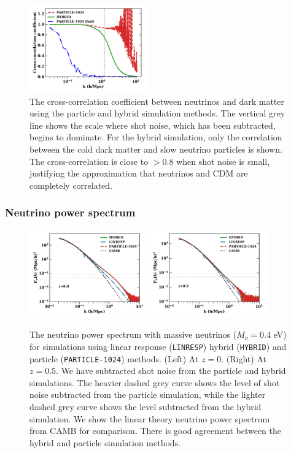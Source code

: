 \documentclass[useAMS, usenatbib]{mnras}
\begin{document}
\begin{figure}
\includegraphics[width=0.45\textwidth]{nuplots/corr_coeff-1.pdf}
  \caption{The cross-correlation coefficient between neutrinos and dark matter using the particle and hybrid simulation methods.
  The vertical grey line shows the scale where shot noise, which has been subtracted, begins to dominate.
  For the hybrid simulation, only the correlation between the cold dark matter and slow neutrino particles is shown.
  The cross-correlation is close to $> 0.8$ when shot noise is small, justifying the approximation that neutrinos and CDM are completely correlated.
  }
  \label{fig:cross-corr}
\end{figure}


\subsubsection{Neutrino power spectrum}

\begin{figure}
\includegraphics[width=0.45\textwidth]{nuplots/pks-nu-1.pdf}
\includegraphics[width=0.45\textwidth]{nuplots/pks-nu-0_6667.pdf}
  \caption{The neutrino power spectrum with massive neutrinos ($M_\nu = 0.4$ eV) for simulations using linear response (\texttt{LINRESP}) hybrid (\texttt{HYBRID}) and particle (\texttt{PARTICLE-1024}) methods. (Left) At $z=0$. (Right) At $z=0.5$. We have subtracted shot noise from the particle and hybrid simulations. The heavier dashed grey curve shows the level of shot noise subtracted from the particle simulation, while the lighter dashed grey curve shows the level subtracted from the hybrid simulation. We show the linear theory neutrino power spectrum from CAMB for comparison. There is good agreement between the hybrid and particle simulation methods.}
  \label{fig:neutrino_power}
\end{figure}
\end{document}
